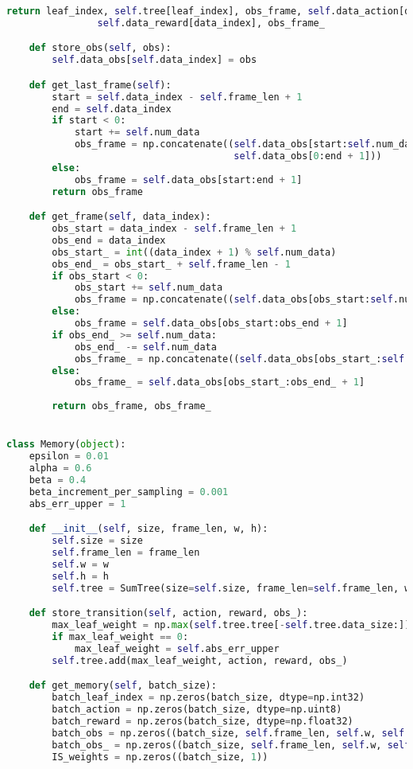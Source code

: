 \begin{lstlisting}[language={python}]
        return leaf_index, self.tree[leaf_index], obs_frame, self.data_action[data_index], \
                self.data_reward[data_index], obs_frame_

    def store_obs(self, obs):
        self.data_obs[self.data_index] = obs

    def get_last_frame(self):
        start = self.data_index - self.frame_len + 1
        end = self.data_index
        if start < 0:
            start += self.num_data
            obs_frame = np.concatenate((self.data_obs[start:self.num_data],
                                        self.data_obs[0:end + 1]))
        else:
            obs_frame = self.data_obs[start:end + 1]
        return obs_frame

    def get_frame(self, data_index):
        obs_start = data_index - self.frame_len + 1
        obs_end = data_index
        obs_start_ = int((data_index + 1) % self.num_data)
        obs_end_ = obs_start_ + self.frame_len - 1
        if obs_start < 0:
            obs_start += self.num_data
            obs_frame = np.concatenate((self.data_obs[obs_start:self.num_data], self.data_obs[0:obs_end + 1]))
        else:
            obs_frame = self.data_obs[obs_start:obs_end + 1]
        if obs_end_ >= self.num_data:
            obs_end_ -= self.num_data
            obs_frame_ = np.concatenate((self.data_obs[obs_start_:self.num_data], self.data_obs[0:obs_end_ + 1]))
        else:
            obs_frame_ = self.data_obs[obs_start_:obs_end_ + 1]
        
        return obs_frame, obs_frame_


class Memory(object):
    epsilon = 0.01
    alpha = 0.6
    beta = 0.4
    beta_increment_per_sampling = 0.001
    abs_err_upper = 1

    def __init__(self, size, frame_len, w, h):
        self.size = size
        self.frame_len = frame_len
        self.w = w
        self.h = h
        self.tree = SumTree(size=self.size, frame_len=self.frame_len, w=self.w, h=self.h)

    def store_transition(self, action, reward, obs_):
        max_leaf_weight = np.max(self.tree.tree[-self.tree.data_size:])
        if max_leaf_weight == 0:
            max_leaf_weight = self.abs_err_upper
        self.tree.add(max_leaf_weight, action, reward, obs_)

    def get_memory(self, batch_size):
        batch_leaf_index = np.zeros(batch_size, dtype=np.int32)
        batch_action = np.zeros(batch_size, dtype=np.uint8)
        batch_reward = np.zeros(batch_size, dtype=np.float32)
        batch_obs = np.zeros((batch_size, self.frame_len, self.w, self.h), dtype=np.uint8)
        batch_obs_ = np.zeros((batch_size, self.frame_len, self.w, self.h), dtype=np.uint8)
        IS_weights = np.zeros((batch_size, 1))


\end{lstlisting}
